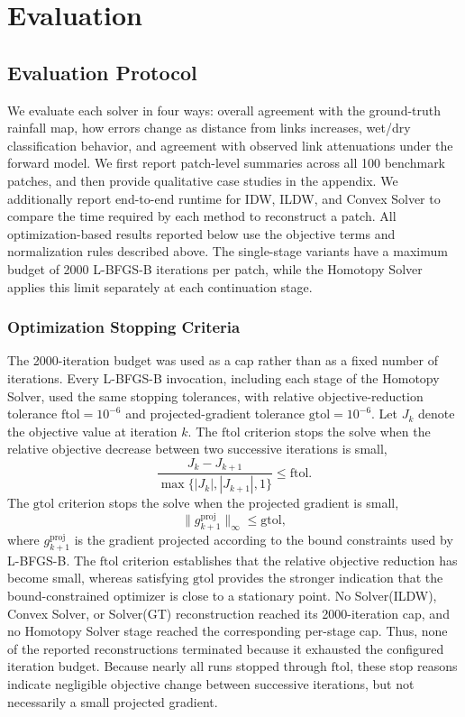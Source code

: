 \documentclass[11pt]{article}
\newcommand{\cleartorecto}{%
  \clearpage
  \ifodd\value{page}
  \else
    \thispagestyle{empty}
    \null
    \clearpage
  \fi
}
\begin{document}
\cleartorecto
\section{Evaluation}
\subsection{Evaluation Protocol}
We evaluate each solver in four ways: overall agreement with the ground-truth rainfall map, how errors change as distance from links increases, wet/dry classification behavior, and agreement with observed link attenuations under the forward model. We first report patch-level summaries across all 100 benchmark patches, and then provide qualitative case studies in the appendix. We additionally report end-to-end runtime for IDW, ILDW, and Convex Solver to compare the time required by each method to reconstruct a patch. {\color{black}All optimization-based results reported below use the objective terms and normalization rules described above. The single-stage variants have a maximum budget of 2000 L-BFGS-B iterations per patch, while the Homotopy Solver applies this limit separately at each continuation stage.}

\subsubsection{Optimization Stopping Criteria}
The 2000-iteration budget was used as a cap rather than as a fixed number of iterations. {\color{black}Every L-BFGS-B invocation, including each stage of the Homotopy Solver, used the same stopping tolerances,} with relative objective-reduction tolerance $\mathrm{ftol}=10^{-6}$ and projected-gradient tolerance $\mathrm{gtol}=10^{-6}$. Let $J_k$ denote the objective value at iteration $k$. The $\mathrm{ftol}$ criterion stops the solve when the relative objective decrease between two successive iterations is small,
\[
\frac{J_k-J_{k+1}}{\max\{|J_k|,|J_{k+1}|,1\}}\leq \mathrm{ftol}.
\]
The $\mathrm{gtol}$ criterion stops the solve when the projected gradient is small,
\[
\|g^{\mathrm{proj}}_{k+1}\|_{\infty}\leq \mathrm{gtol},
\]
where $g^{\mathrm{proj}}_{k+1}$ is the gradient projected according to the bound constraints used by L-BFGS-B. {\color{black}The $\mathrm{ftol}$ criterion establishes that the relative objective reduction has become small, whereas satisfying $\mathrm{gtol}$ provides the stronger indication that the bound-constrained optimizer is close to a stationary point. No Solver(ILDW), Convex Solver, or Solver(GT) reconstruction reached its 2000-iteration cap, and no Homotopy Solver stage reached the corresponding per-stage cap. Thus, none of the reported reconstructions terminated because it exhausted the configured iteration budget. Because nearly all runs stopped through $\mathrm{ftol}$, these stop reasons indicate negligible objective change between successive iterations, but not necessarily a small projected gradient.}
\end{document}
